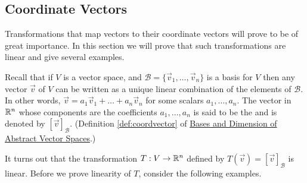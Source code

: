 \documentclass{ximera}
\begin{document}
\subsection*{Coordinate Vectors}
Transformations that map vectors to their coordinate vectors will prove to be of great importance.  In this section we will prove that such transformations are linear and give several examples.

Recall that if $V$ is a vector space, and  $\mathcal{B}=\{\vec{v}_1, \ldots ,\vec{v}_n\}$ is a basis for $V$ then any vector $\vec{v}$ of $V$ can be written as a unique linear combination of the elements of $\mathcal{B}$.  In other words, $\vec{v}=a_1\vec{v}_1+\ldots +a_n\vec{v}_n$ for some scalars $a_1, \ldots ,a_n$.  The vector in $\mathbb{R}^n$ whose components are the coefficients $a_1, \ldots ,a_n$  is said to be the  and is denoted by $[\vec{v}]_{\mathcal{B}}$.  (Definition \ref{def:coordvector} of \href{https://ximera.osu.edu/oerlinalg/LinearAlgebra/VSP-0060/main}{Bases and Dimension of Abstract Vector Spaces}.)  

It turns out that the transformation $T:V\rightarrow \mathbb{R}^n$ defined by $T(\vec{v})=[\vec{v}]_{\mathcal{B}}$ is linear.  Before we prove linearity of $T$, consider the following examples.
\end{document}
